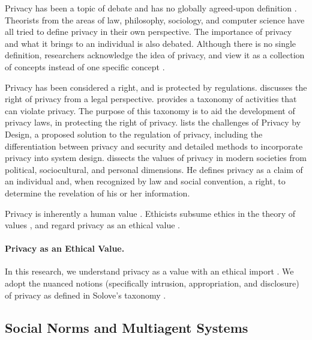 Privacy has been a topic of debate and has no globally
agreed-upon definition \citep{smith2007privacy}. Theorists from the
areas of law, philosophy, sociology, and computer science have all tried
to define privacy in their own perspective.
The importance of privacy and what it brings to an individual is also
debated. Although there is no single definition, researchers 
acknowledge the idea of privacy, and view it as a
collection of concepts instead of one specific concept
\citep{smith2007privacy}. 

Privacy has been considered a right, and is protected by regulations. 
\citet{Prosser-60:Privacy} discusses the right of privacy from a legal perspective. 
\citet{solove-2006-taxonomy} provides a taxonomy of activities that can violate privacy. 
The purpose of this taxonomy is to aid the development of privacy laws, in protecting the right of privacy.
\citet{Spiekermann-2012-Challenges+PrivacyDesign} lists the challenges of Privacy by Design, a proposed solution to the regulation of privacy, including the differentiation between privacy and security and detailed methods to incorporate privacy into system design. 
\citet{westin2003social} dissects the values of privacy in modern societies from political, sociocultural, and personal dimensions.
He defines privacy as a claim of an individual and, when recognized by law and social convention, a right, to determine the revelation of his or her information.


Privacy is inherently a human value \citep{spiekermann2009enggprivacy,smith2007privacy}. 
Ethicists subsume ethics in the theory of values \citep{Friedman+08:value-sensitive-design}, and regard privacy as an ethical value \citep{Langheinrich-01:privacy,Taylor-2002-PrivacyAutonomy}. 


\paragraph*{Privacy as an Ethical Value.}
In this research, we understand privacy as a value with an ethical import \citep{Langheinrich-01:privacy,Taylor-2002-PrivacyAutonomy}. 
We adopt the nuanced notions (specifically intrusion, appropriation, and disclosure) of privacy as defined in Solove's taxonomy \citep{solove-2006-taxonomy}. 


\subsection{Social Norms and Multiagent Systems}

